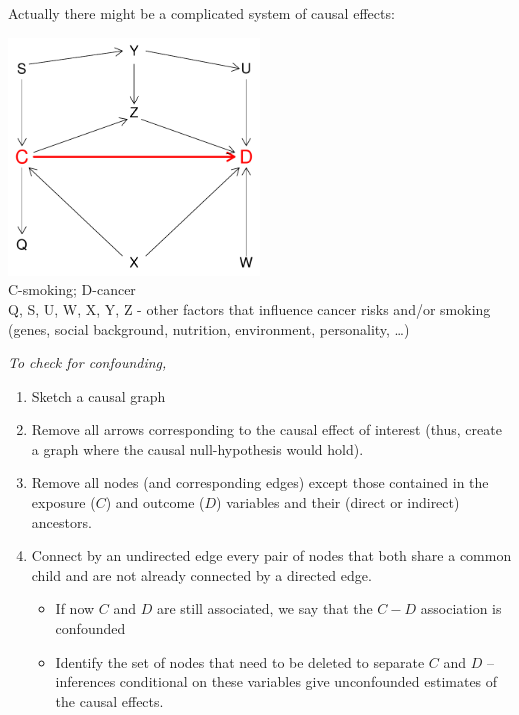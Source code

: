 \documentclass{beamer}
\begin{document}



\begin{frame}
 Actually there might be a complicated system of
causal effects:

{\includegraphics[width=0.5\textwidth]{keeruline2}}\\
{\small  C-smoking; D-cancer \\
Q, S, U, W, X, Y, Z - other factors that influence cancer risks
and/or smoking (genes, social background, nutrition, environment,
personality, \ldots)}
\end{frame}

\begin{frame}
 \emph{To check for confounding,}

\begin{enumerate}
\item Sketch a causal graph
\item
 Remove all arrows corresponding to the causal effect of interest
 (thus, create a graph where the causal null-hypothesis would hold).
 \item Remove all nodes (and corresponding edges) except
 those contained in the exposure ($C$) and outcome ($D$) variables and their (direct or indirect)
ancestors. 
\item
Connect by an undirected edge every pair of nodes that both
share a common child and are not already connected by a
directed edge. 
\begin{itemize}
\item If now $C$ and $D$ are still associated, we say that the $C-D$
association is confounded  
\item Identify the set of nodes that need to be deleted to separate $C$ and $D$ --  inferences conditional
on these variables give unconfounded estimates of the causal effects.
\end{itemize}
\end{enumerate}
\end{frame}
\end{document}
